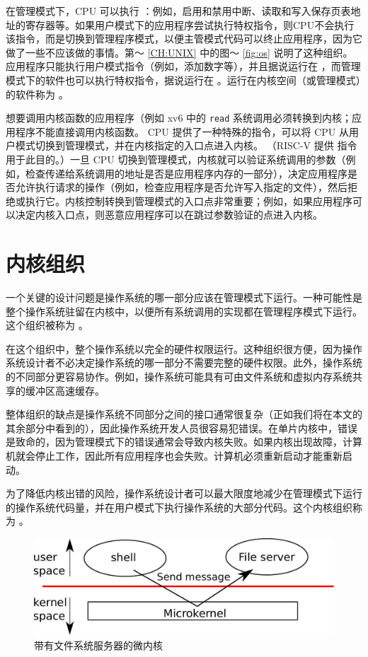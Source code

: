 \documentclass[UTF8]{article}
\begin{document}
在管理模式下，CPU 可以执行
        ：例如，启用和禁用中断、读取和写入保存页表地址的寄存器等。如果用户模式下的应用程序尝试执行特权指令，则CPU不会执行该指令，而是切换到管理程序模式，以便主管模式代码可以终止应用程序，因为它做了一些不应该做的事情。第〜   \ref{CH:UNIX}   中的图〜   \ref{fig:os}   说明了这种组织。应用程序只能执行用户模式指令（例如，添加数字等），并且据说运行在
       ，而管理模式下的软件也可以执行特权指令，据说运行在
        。运行在内核空间（或管理模式）的软件称为
        。  

想要调用内核函数的应用程序（例如
 xv6 中的    \lstinline{read}    系统调用必须转换到内核；应用程序不能直接调用内核函数。 CPU 提供了一种特殊的指令，可以将 CPU 从用户模式切换到管理模式，并在内核指定的入口点进入内核。 （RISC-V 提供
        指令用于此目的。）一旦 CPU 切换到管理模式，内核就可以验证系统调用的参数（例如，检查传递给系统调用的地址是否是应用程序内存的一部分），决定应用程序是否允许执行请求的操作（例如，检查应用程序是否允许写入指定的文件），然后拒绝或执行它。内核控制转换到管理模式的入口点非常重要；例如，如果应用程序可以决定内核入口点，则恶意应用程序可以在跳过参数验证的点进入内核。
    \section{内核组织  }     

一个关键的设计问题是操作系统的哪一部分应该在管理模式下运行。一种可能性是整个操作系统驻留在内核中，以便所有系统调用的实现都在管理程序模式下运行。这个组织被称为
        。  

在这个组织中，整个操作系统以完全的硬件权限运行。这种组织很方便，因为操作系统设计者不必决定操作系统的哪一部分不需要完整的硬件权限。此外，操作系统的不同部分更容易协作。例如，操作系统可能具有可由文件系统和虚拟内存系统共享的缓冲区高速缓存。  

整体组织的缺点是操作系统不同部分之间的接口通常很复杂（正如我们将在本文的其余部分中看到的），因此操作系统开发人员很容易犯错误。在单片内核中，错误是致命的，因为管理模式下的错误通常会导致内核失败。如果内核出现故障，计算机就会停止工作，因此所有应用程序也会失败。计算机必须重新启动才能重新启动。  

为了降低内核出错的风险，操作系统设计者可以最大限度地减少在管理模式下运行的操作系统代码量，并在用户模式下执行操作系统的大部分代码。这个内核组织称为
        。  

   \begin{figure}[t]
\center
\includegraphics[scale=0.5]{fig/mkernel.pdf}
\caption{带有文件系统服务器的微内核  }
\label{fig:mkernel}
\end{figure}     
\end{document}
